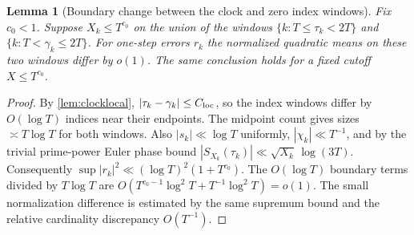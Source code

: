 \documentclass[11pt,reqno]{amsart}
\numberwithin{equation}{section}
\newtheorem{lemma}[theorem]{Lemma}
\begin{document}
\begin{lemma}[Boundary change between the clock and zero index windows]\label{lem:boundaryswitch}
Fix $c_0<1$. Suppose $X_k\le T^{c_0}$ on the union of the windows
$\{k:T\le\tau_k<2T\}$ and $\{k:T<\gamma_k\le2T\}$.
For one-step errors $r_k$ the normalized quadratic means on these
two windows differ by $o(1)$. The same conclusion holds for a
fixed cutoff $X\le T^{c_0}$.
\end{lemma}
\begin{proof}
By \cref{lem:clocklocal}, $|\tau_k-\gamma_k|\le C_{\rm loc}$,
so the index windows differ by $O(\log T)$ indices near their
endpoints. The midpoint count gives sizes $\asymp T\log T$ for
both windows. Also $|s_k|\ll\log T$ uniformly,
$|\chi_k|\ll T^{-1}$, and by the trivial prime-power Euler phase
bound $|S_{X_k}(\tau_k)|\ll\sqrt{X_k}\,\log(3T)$.
Consequently $\sup|r_k|^2\ll(\log T)^2(1+T^{c_0})$.
The $O(\log T)$ boundary terms divided by $T\log T$ are
$O(T^{c_0-1}\log^2T+T^{-1}\log^2T)=o(1)$.
The small normalization difference is estimated by the same
supremum bound and the relative cardinality discrepancy
$O(T^{-1})$.\end{proof}
\end{document}
